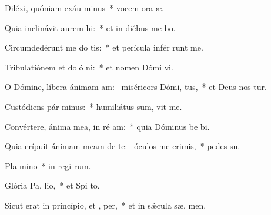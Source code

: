 \item Diléxi, quóniam exáu minus~* vocem ora æ.
\item Quia inclinávit aurem  hi:~* et in diébus me bo.
\item Circumdedérunt me do tis:~* et perícula infér runt me.
\item Tribulatiónem et doló ni:~* et nomen Dómi vi.
\item O Dómine, líbera ánimam am:~\pscross{} miséricors Dómi,  tus,~* et Deus nos tur.
\item Custódiens pár minus:~* humiliátus sum,  vit me.
\item Convértere, ánima mea, in ré am:~* quia Dóminus be bi.
\item Quia erípuit ánimam meam de te:~\pscross{} óculos me  crimis,~* pedes   su.
\item Pla mino~* in regi rum.
\item Glória Pa,  lio,~* et Spi to.
\item Sicut erat in princípio, et ,  per,~* et in sǽcula sæ. men.
